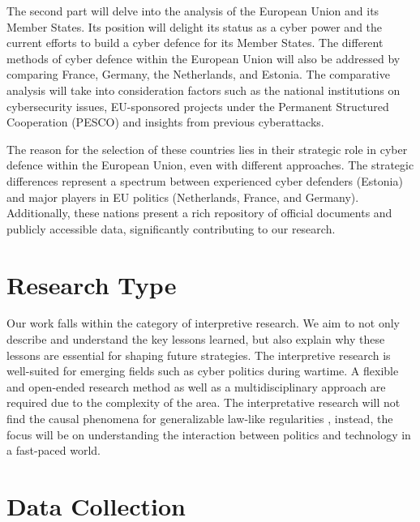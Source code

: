 The second part will delve into the analysis of the European Union and its Member States. Its position will delight its status as a cyber power and the current efforts to build a cyber defence for its Member States. The different methods of cyber defence within the European Union will also be addressed by comparing France, Germany, the Netherlands, and Estonia. The comparative analysis will take into consideration factors such as the national institutions on cybersecurity issues, EU-sponsored projects under the Permanent Structured Cooperation (PESCO) and insights from previous cyberattacks.

The reason for the selection of these countries lies in their strategic role in cyber defence within the European Union, even with different approaches. The strategic differences represent a spectrum between experienced cyber defenders (Estonia) and major players in EU politics (Netherlands, France, and Germany). Additionally, these nations present a rich repository of official documents and publicly accessible data, significantly contributing to our research.

\section{Research Type}

Our work falls within the category of interpretive research. We aim to not only describe and understand the key lessons learned, but also explain why these lessons are essential for shaping future strategies. The interpretive research is well-suited for emerging fields such as cyber politics during wartime. A flexible and open-ended research method as well as a multidisciplinary approach are required due to the complexity of the area. The interpretative research will not find the causal phenomena for generalizable law-like regularities \autocite{lamont_2021_research}, instead, the focus will be on understanding the interaction between politics and technology in a fast-paced world.

\section{Data Collection}

